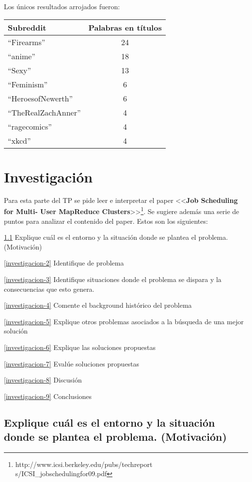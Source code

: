 \documentclass[11pt, a4paper, twoside]{article}
\begin{document}
Los únicos resultados arrojados fueron:

\begin{center}
  \begin{tabular}{l|c}
    \textbf{Subreddit} & \textbf{Palabras en títulos} \\ \hline
    ``Firearms'' & 24 \\
    ``anime'' & 18 \\
    ``Sexy'' & 13 \\
    ``Feminism'' & 6 \\
    ``HeroesofNewerth'' & 6 \\
    ``TheRealZachAnner'' & 4 \\
    ``ragecomics'' & 4 \\
    ``xkcd'' & 4 \\
  \end{tabular}
\end{center}

\clearpage
\section{Investigación}
Para esta parte del TP se pide leer e interpretar el paper <<\textbf{Job
Scheduling for Multi- User MapReduce
Clusters}>>\footnote{http://www.icsi.berkeley.edu/pubs/techreport
s/ICSI\_jobschedulingfor09.pdf}. Se sugiere además una serie de puntos
para analizar el contenido del paper. Estos son los siguientes:

\vspace{3em}
\ref{investigacion-1} Explique cuál es el entorno y la situación donde se plantea el problema. (Motivación)

\ref{investigacion-2} Identifique de problema

\ref{investigacion-3} Identifique situaciones donde el problema se dispara y la consecuencias que esto genera.

\ref{investigacion-4} Comente el background histórico del problema

\ref{investigacion-5} Explique otros problemas asociados a la búsqueda de una mejor solución

\ref{investigacion-6} Explique las soluciones propuestas

\ref{investigacion-7} Evalúe soluciones propuestas

\ref{investigacion-8} Discusión

\ref{investigacion-9} Conclusiones

\clearpage
\subsection {\footnotesize Explique cuál es el entorno y la situación donde se plantea el problema. (Motivación)}
\label{investigacion-1}
\end{document}
